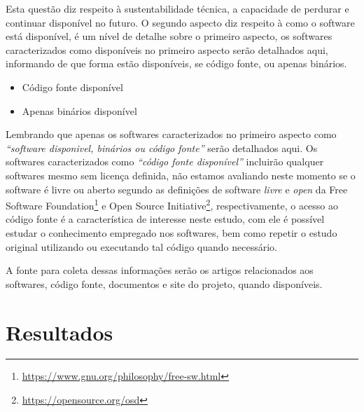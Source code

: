 
Esta questão diz respeito à sustentabilidade técnica, a capacidade de perdurar
e continuar disponível no futuro. O segundo aspecto diz respeito à como o
software está disponível, é um nível de detalhe sobre o primeiro aspecto, os
softwares caracterizados como disponíveis no primeiro aspecto serão detalhados
aqui, informando de que forma estão disponíveis, se código fonte, ou apenas
binários.

\begin{itemize}
  \item Código fonte disponível
  \item Apenas binários disponível
\end{itemize}


Lembrando que apenas os softwares caracterizados no primeiro aspecto como
{\it``software disponivel, binários ou código fonte''} serão detalhados aqui.
Os softwares caracterizados como {\it ``código fonte disponível''} incluirão
qualquer softwares mesmo sem licença definida, não estamos avaliando neste
momento se o software é livre ou aberto segundo as definições de software {\it
livre} e {\it open} da Free Software
Foundation\footnote{\url{https://www.gnu.org/philosophy/free-sw.html}} e Open
Source Initiative\footnote{\url{https://opensource.org/osd}}, respectivamente,
o acesso ao código fonte é a característica de interesse neste estudo, com ele
é possível estudar o conhecimento empregado nos softwares, bem como repetir o
estudo original utilizando ou executando tal código quando necessário.

A fonte para coleta dessas informações serão os artigos relacionados aos
softwares, código fonte, documentos e site do projeto, quando disponíveis.

\section{Resultados}

